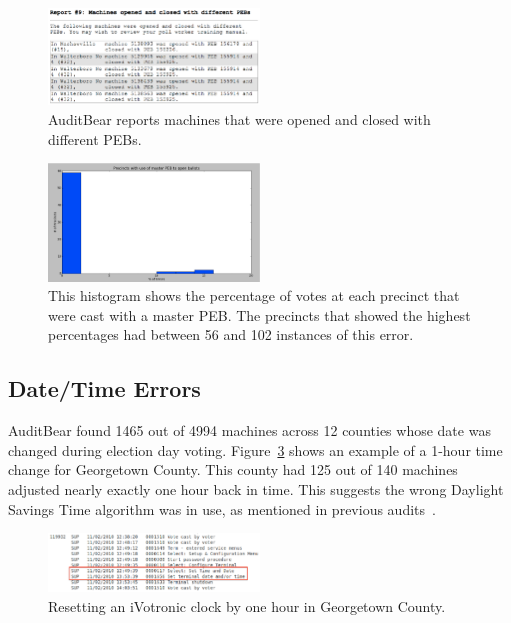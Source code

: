 \documentclass[letterpaper,twocolumn,10pt]{article}
\begin{document}
\begin{figure}[htbp]
\begin{center}
    \includegraphics[width=0.5\textwidth,height=0.2\textheight]{OpenClosePEBs.eps}
\end{center}
\caption{AuditBear reports machines that were opened and closed with different PEBs.}
\label{fig:diff-pebs-open-close}
\end{figure}

\begin{figure}[htbp]
\begin{center}
    \includegraphics[width=0.5\textwidth,height=0.4\textheight]{PEBactivateHist.eps}
\end{center}
\caption{This histogram shows the percentage of votes at each precinct that were 
cast with a master PEB.  The precincts that showed the highest percentages had 
between 56 and 102 instances of this error.}
\label{fig:master-peb-activated}
\end{figure}

\subsection{Date/Time Errors}
 AuditBear found 1465 out of 4994 machines across 12 counties whose date was
 changed during election day voting. Figure~\ref{fig:one-hour-reset} shows an
 example of a 1-hour time change for Georgetown County. This county had 125 out
 of 140 machines adjusted nearly exactly one hour back in time. This suggests
 the wrong Daylight Savings Time algorithm was in use, as mentioned in previous
 audits~\cite{Buell2011}.

\begin{figure}[htbp]
\begin{center}
    \includegraphics[width=0.5\textwidth,height=0.1\textheight]{ResetClock.eps}
\end{center}
\caption{Resetting an iVotronic clock by one hour in Georgetown County.}
\label{fig:one-hour-reset}
\end{figure}
\end{document}
